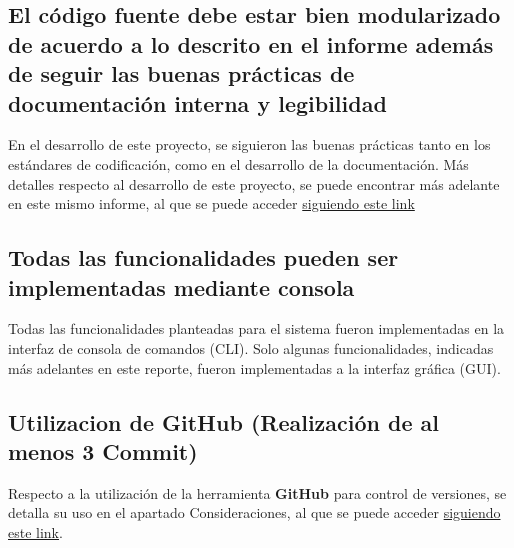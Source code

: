 \clearpage

\subsection{El código fuente debe estar bien modularizado de acuerdo a lo descrito en el informe además de seguir las buenas prácticas de documentación interna y legibilidad}

En el desarrollo de este proyecto, se siguieron las buenas prácticas tanto en los estándares de codificación, como en el desarrollo de la documentación. Más detalles respecto al desarrollo de este proyecto, se puede encontrar más adelante en este mismo informe, al que se puede acceder {\color{MyGreen}\hyperref[subsec:desarrolloapp]{siguiendo este link}}

\subsection{Todas las funcionalidades pueden ser implementadas mediante consola}

Todas las funcionalidades planteadas para el sistema fueron implementadas en la interfaz de consola de comandos (CLI). Solo algunas funcionalidades, indicadas más adelantes en este reporte, fueron implementadas a la interfaz gráfica (GUI).

\subsection{Utilizacion de GitHub (Realización de al menos 3 Commit)}

Respecto a la utilización de la herramienta \textbf{GitHub} para control de versiones, se detalla su uso en el apartado Consideraciones, al que se puede acceder {\color{MyGreen}\hyperref[cons:utilizaciongithub]{siguiendo este link}}.
